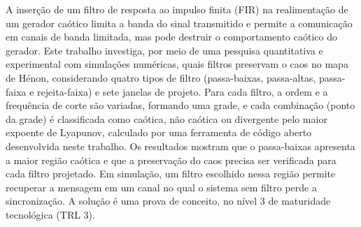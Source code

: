 \documentclass{pfccefsa}
\begin{document}
\imprimirtitulo
\imprimirautores
\imprimirorientador

\begin{resumo}
A inserção de um filtro de resposta ao impulso finita (FIR) na realimentação de um gerador caótico limita a banda do sinal transmitido e permite a comunicação em canais de banda limitada, mas pode destruir o comportamento caótico do gerador. Este trabalho investiga, por meio de uma pesquisa quantitativa e experimental com simulações numéricas, quais filtros preservam o caos no mapa de Hénon, considerando quatro tipos de filtro (passa-baixas, passa-altas, passa-faixa e rejeita-faixa) e sete janelas de projeto. Para cada filtro, a ordem e a frequência de corte são variadas, formando uma grade, e cada combinação (ponto da grade) é classificada como caótica, não caótica ou divergente pelo maior expoente de Lyapunov, calculado por uma ferramenta de código aberto desenvolvida neste trabalho. Os resultados mostram que o passa-baixas apresenta a maior região caótica e que a preservação do caos precisa ser verificada para cada filtro projetado. Em simulação, um filtro escolhido nessa região permite recuperar a mensagem em um canal no qual o sistema sem filtro perde a sincronização. A solução é uma prova de conceito, no nível 3 de maturidade tecnológica (TRL 3).
\end{resumo}


\begin{abstract}
Inserting a finite impulse response (FIR) filter in the feedback loop of a chaotic generator limits the bandwidth of the transmitted signal and enables communication over band-limited channels, but it may destroy the chaotic behaviour of the generator. This work investigates, through a quantitative experimental study based on numerical simulations, which filters preserve chaos in the Hénon map, considering four filter types (lowpass, highpass, bandpass and bandstop) and seven design windows. For each filter, the order and the cutoff frequency are varied, forming a grid, and each combination (grid point) is classified as chaotic, non-chaotic or divergent by the largest Lyapunov exponent, calculated by an open-source tool developed in this work. The results show that the lowpass filter has the largest chaotic region and that chaos preservation must be verified for each designed filter. In simulation, a filter chosen in this region recovers the message over a channel in which the unfiltered system loses synchronisation. The solution is a proof of concept at technology readiness level 3 (TRL 3).
\end{abstract}
\end{document}
